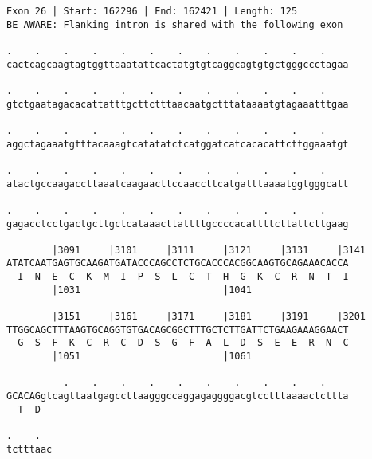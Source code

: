 \documentclass{article}
\begin{document}
\newpage
\begin{Verbatim}
Exon 26 | Start: 162296 | End: 162421 | Length: 125
BE AWARE: Flanking intron is shared with the following exon
 
.    .    .    .    .    .    .    .    .    .    .    .    
cactcagcaagtagtggttaaatattcactatgtgtcaggcagtgtgctgggccctagaa
  
.    .    .    .    .    .    .    .    .    .    .    .    
gtctgaatagacacattatttgcttctttaacaatgctttataaaatgtagaaatttgaa
  
.    .    .    .    .    .    .    .    .    .    .    .    
aggctagaaatgtttacaaagtcatatatctcatggatcatcacacattcttggaaatgt
  
.    .    .    .    .    .    .    .    .    .    .    .    
atactgccaagaccttaaatcaagaacttccaaccttcatgatttaaaatggtgggcatt
  
.    .    .    .    .    .    .    .    .    .    .    .    
gagacctcctgactgcttgctcataaacttattttgccccacattttcttattcttgaag
  
        |3091     |3101     |3111     |3121     |3131     |3141
ATATCAATGAGTGCAAGATGATACCCAGCCTCTGCACCCACGGCAAGTGCAGAAACACCA
  I  N  E  C  K  M  I  P  S  L  C  T  H  G  K  C  R  N  T  I
        |1031                         |1041                 
  
        |3151     |3161     |3171     |3181     |3191     |3201
TTGGCAGCTTTAAGTGCAGGTGTGACAGCGGCTTTGCTCTTGATTCTGAAGAAAGGAACT
  G  S  F  K  C  R  C  D  S  G  F  A  L  D  S  E  E  R  N  C
        |1051                         |1061                 
  
          .    .    .    .    .    .    .    .    .    .    
GCACAGgtcagttaatgagccttaagggccaggagaggggacgtcctttaaaactcttta
  T  D                                                      
  
.    .  
tctttaac
\end{Verbatim}
\newpage
\end{document}
